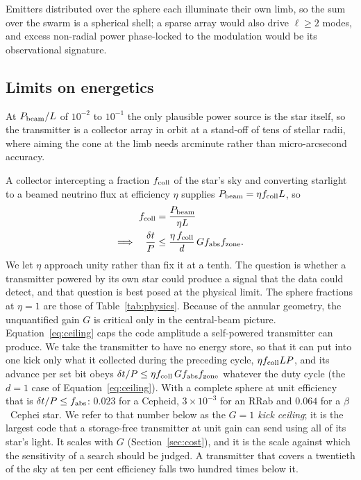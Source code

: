 \documentclass[final,5p]{elsarticle}
\newcommand{\dtp}{\ensuremath{\delta t/P}}
\newcommand{\bcep}{\ensuremath{\beta}~Cephei}
\newcommand{\pbeam}{\ensuremath{P_{\rm beam}}}
\begin{document}
Emitters distributed over the sphere each illuminate their own limb, so the sum over the swarm is a spherical shell; a sparse array would also drive $\ell\ge2$ modes, and excess non-radial power phase-locked to the modulation would be its observational signature.

\subsection{Limits on energetics}
\label{sec:swarm}

At $\pbeam/L$ of $10^{-2}$ to $10^{-1}$ the only plausible power source is the star itself, so the transmitter is a collector array in orbit at a stand-off of tens of stellar radii, where aiming the cone at the limb needs arcminute rather than micro-arcsecond accuracy.

A collector intercepting a fraction $f_{\rm coll}$ of the star's sky and converting starlight to a beamed neutrino flux at efficiency $\eta$ supplies $\pbeam=\eta f_{\rm coll}L$, so
\begin{equation}
  \begin{aligned}
    f_{\rm coll} &= \frac{\pbeam}{\eta L} \\
    \Longrightarrow\quad \frac{\delta t}{P}
      &\le \frac{\eta\, f_{\rm coll}}{d}\, G f_{\rm abs} f_{\rm zone} .
  \end{aligned}
  \label{eq:ceiling}
\end{equation}
We let $\eta$ approach unity rather than fix it at a tenth. The question is whether a transmitter powered by its own star could produce a signal that the data could detect, and that question is best posed at the physical limit. The sphere fractions at $\eta=1$ are those of Table~\ref{tab:physics}. Because of the annular geometry, the unquantified gain $G$ is critical only in the central-beam picture. Equation~\ref{eq:ceiling} caps the code amplitude a self-powered transmitter can produce. We take the transmitter to have no energy store, so that it can put into one kick only what it collected during the preceding cycle, $\eta f_{\rm coll}LP$, and its advance per set bit obeys $\dtp\le\eta f_{\rm coll}\,Gf_{\rm abs}f_{\rm zone}$ whatever the duty cycle (the $d=1$ case of Equation~\ref{eq:ceiling}). With a complete sphere at unit efficiency that is $\dtp\le f_{\rm abs}$: $0.023$ for a Cepheid, $3\times10^{-3}$ for an RRab and $0.064$ for a \bcep{} star. We refer to that number below as the \emph{$G=1$ kick ceiling}; it is the largest code that a storage-free transmitter at unit gain can send using all of its star's light. It scales with $G$ (Section~\ref{sec:cost}), and it is the scale against which the sensitivity of a search should be judged. A transmitter that covers a twentieth of the sky at ten per cent efficiency falls two hundred times below it.
\end{document}
